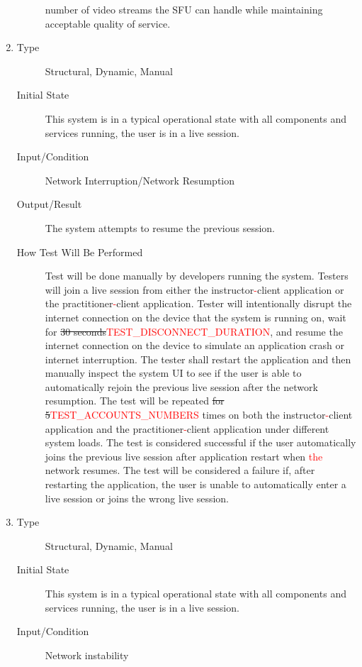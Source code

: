 \documentclass[12pt, titlepage]{article}
\newcommand{\rt}[1]{\textcolor{red}{#1}}
\begin{document}
\begin{enumerate}[NFR-T1]
\begin{description}
    number of video streams the SFU can handle while maintaining acceptable
    quality of service.
  \end{description}
\item \label{NFRT7}
  \begin{description}
  \item[Type] Structural, Dynamic, Manual
  \item[Initial State] This system is in a typical operational state with all
    components and services running, the user is in a live session.
  \item[Input/Condition] Network Interruption/Network Resumption
  \item[Output/Result] The system attempts to resume the previous session.
  \item[How Test Will Be Performed] Test will be done manually by developers
    running the system. Testers will join a live session from either the
    instructor\rt{-}client application or the practitioner\rt{-}client application. Tester
    will intentionally disrupt the internet connection on the device that the
    system is running on, wait for \sout{30 seconds}\rt{TEST\_DISCONNECT\_DURATION}, and resume the internet
    connection on the device to simulate an application crash or internet
    interruption. The tester shall restart the application and then manually
    inspect the system UI to see if the user is able to automatically rejoin the
    previous live session after the network resumption. The test will be
    repeated \sout{for} \sout{5}\rt{TEST\_ACCOUNTS\_NUMBERS} times on both the instructor\rt{-}client application and the
    practitioner\rt{-}client application under different system loads. The test is
    considered successful if the user automatically joins the previous live
    session after application restart when \rt{the} network resumes. The test will be
    considered a failure if, after restarting the application, the user is
    unable to automatically enter a live session or joins the wrong live
    session.
  \end{description}
\item \label{NFRT8}
  \begin{description}
  \item[Type] Structural, Dynamic, Manual
  \item[Initial State] This system is in a typical operational state with all
    components and services running, the user is in a live session.
  \item[Input/Condition] Network instability

\end{description}
\end{enumerate}
\end{document}
